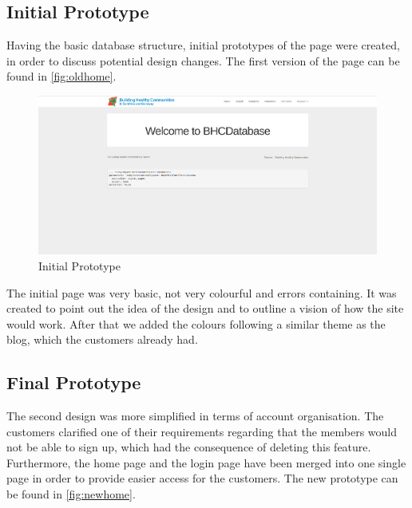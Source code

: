 \documentclass{l3proj}
\begin{document}
\subsection{Initial Prototype}
\label{sec:prototype1}

Having the basic database structure, initial prototypes of the page were created, in order to discuss potential design changes. The first version of the page can be found in \autoref{fig:oldhome}.

\begin{figure}[h]
\centerline{\includegraphics[width=\textwidth, height=\textheight, keepaspectratio]{oldhome.png}}
\caption{Initial Prototype}
\label{fig:oldhome}
\end{figure}

The initial page was very basic, not very colourful and errors containing. It was created to point out the idea of the design and to outline a vision of how the site would work. After that we added the colours following a similar theme as the blog, which the customers already had.

\subsection{Final Prototype}
\label{sec:prototype2}

The second design was more simplified in terms of account organisation. The customers clarified one of their requirements regarding that the members would not be able to sign up, which had the consequence of deleting this feature. Furthermore, the home page and the login page have been merged into one single page in order to provide easier access for the customers. The new prototype can be found in \autoref{fig:newhome}.
\end{document}
